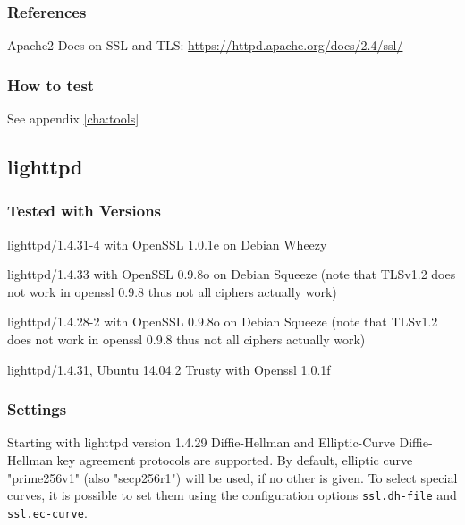 \subsubsection{References}
\begin{itemize*}
  \item Apache2 Docs on SSL and TLS: \url{https://httpd.apache.org/docs/2.4/ssl/}
\end{itemize*}


\subsubsection{How to test}
See appendix \ref{cha:tools}


\subsection{lighttpd}

\subsubsection{Tested with Versions}
\begin{itemize*}
  \item lighttpd/1.4.31-4 with OpenSSL 1.0.1e on Debian Wheezy
  \item lighttpd/1.4.33 with OpenSSL 0.9.8o on Debian Squeeze (note that TLSv1.2 does not work in openssl 0.9.8 thus not all ciphers actually work)
  \item lighttpd/1.4.28-2 with OpenSSL 0.9.8o on Debian Squeeze (note that TLSv1.2 does not work in openssl 0.9.8 thus not all ciphers actually work)
  \item lighttpd/1.4.31, Ubuntu 14.04.2 Trusty with Openssl 1.0.1f
\end{itemize*}


\subsubsection{Settings}

Starting with lighttpd version 1.4.29 Diffie-Hellman and Elliptic-Curve Diffie-Hellman key agreement protocols are supported.
By default, elliptic curve "prime256v1" (also "secp256r1") will be used, if no other is given.
To select special curves, it is possible to set them using the configuration options \verb|ssl.dh-file| and \verb|ssl.ec-curve|.

